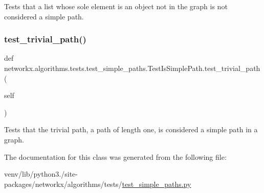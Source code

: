 \begin{DoxyVerb}Tests that a list whose sole element is an object not in the
graph is not considered a simple path.\end{DoxyVerb}
 \mbox{\label{classnetworkx_1_1algorithms_1_1tests_1_1test__simple__paths_1_1TestIsSimplePath_a6aeebd2425aa2a5123ba3e77fc3de70e}} 
\subsubsection{\texorpdfstring{test\+\_\+trivial\+\_\+path()}{test\_trivial\_path()}}
{\footnotesize\ttfamily def networkx.\+algorithms.\+tests.\+test\+\_\+simple\+\_\+paths.\+Test\+Is\+Simple\+Path.\+test\+\_\+trivial\+\_\+path (\begin{DoxyParamCaption}\item[{}]{self }\end{DoxyParamCaption})}

\begin{DoxyVerb}Tests that the trivial path, a path of length one, is
considered a simple path in a graph.\end{DoxyVerb}
 

The documentation for this class was generated from the following file\+:\begin{DoxyCompactItemize}
\item 
venv/lib/python3./site-\/packages/networkx/algorithms/tests/\hyperlink{test__simple__paths_8py}{test\+\_\+simple\+\_\+paths.\+py}\end{DoxyCompactItemize}
